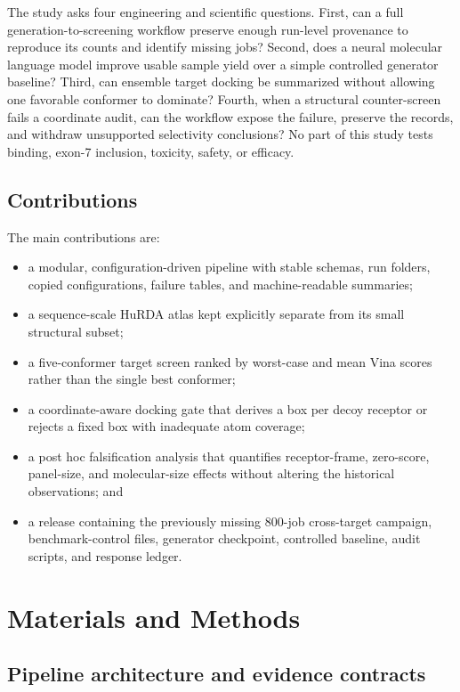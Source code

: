 \documentclass[journal]{IEEEtran}
\begin{document}
The study asks four engineering and scientific questions. First, can a
full generation-to-screening workflow preserve enough run-level
provenance to reproduce its counts and identify missing jobs? Second,
does a neural molecular language model improve usable sample yield over
a simple controlled generator baseline? Third, can ensemble target
docking be summarized without allowing one favorable conformer to
dominate? Fourth, when a structural counter-screen fails a coordinate
audit, can the workflow expose the failure, preserve the records, and
withdraw unsupported selectivity conclusions? No part of this study
tests binding, exon-7 inclusion, toxicity, safety, or efficacy.

\subsection{Contributions}

The main contributions are:
\begin{itemize}
\item a modular, configuration-driven pipeline with stable schemas,
run folders, copied configurations, failure tables, and machine-readable
summaries;
\item a sequence-scale HuRDA atlas kept explicitly separate from its
small structural subset;
\item a five-conformer target screen ranked by worst-case and mean Vina
scores rather than the single best conformer;
\item a coordinate-aware docking gate that derives a box per decoy
receptor or rejects a fixed box with inadequate atom coverage;
\item a post hoc falsification analysis that quantifies receptor-frame,
zero-score, panel-size, and molecular-size effects without altering the
historical observations; and
\item a release containing the previously missing 800-job cross-target
campaign, benchmark-control files, generator checkpoint, controlled
baseline, audit scripts, and response ledger.
\end{itemize}

\section{Materials and Methods}

\subsection{Pipeline architecture and evidence contracts}
\end{document}
